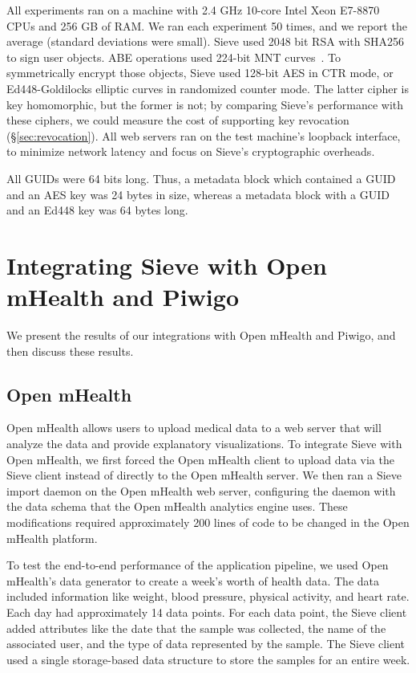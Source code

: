All experiments ran on a machine with 2.4 GHz 10-core
Intel Xeon E7-8870 CPUs and 256 GB of RAM. We ran each
experiment 50 times, and we report the average
(standard deviations were small).
Sieve used 2048 bit RSA with SHA256 to sign
user objects. ABE operations used 224-bit MNT
curves~\cite{mnt224}. To symmetrically encrypt
those objects, Sieve used 128-bit AES in CTR
mode, or Ed448-Goldilocks elliptic curves in
randomized counter mode. The latter cipher is
key homomorphic, but the former is not; by
comparing Sieve's performance with these ciphers,
we could measure the cost of supporting key
revocation (\S\ref{sec:revocation}). All web
servers ran on the test machine's loopback
interface, to minimize network latency and
focus on Sieve's cryptographic overheads.

All GUIDs were 64 bits long. Thus, a metadata
block which contained a GUID and an AES key
was 24 bytes in size, whereas a metadata block
with a GUID and an Ed448 key was 64 bytes long.

\section{Integrating Sieve with Open mHealth and Piwigo}
\label{sec:integration}
We present the results of our integrations
with Open mHealth and Piwigo, and then discuss
these results.

\subsection{Open mHealth}
Open mHealth allows users to upload medical
data to a web server that will analyze the
data and provide explanatory visualizations.
To integrate Sieve with Open mHealth, we first 
forced the Open mHealth
client to upload data via the Sieve client
instead of directly to the Open mHealth server.
We then ran a Sieve import daemon on the Open
mHealth web server, configuring the daemon
with the data schema that the Open mHealth
analytics engine uses. These modifications
required approximately 200 lines of code
to be changed in the Open mHealth platform.

To test the end-to-end performance of the
application pipeline, we used Open mHealth's
data generator to create a week's worth of
health data. The data included information
like weight, blood pressure, physical activity,
and heart rate. Each day had approximately
14 data points. For each data point, the
Sieve client added attributes like the
date that the sample was collected, the
name of the associated user, and the type
of data represented by the sample. The Sieve
client used a single storage-based data 
structure to store the samples for an entire week.

